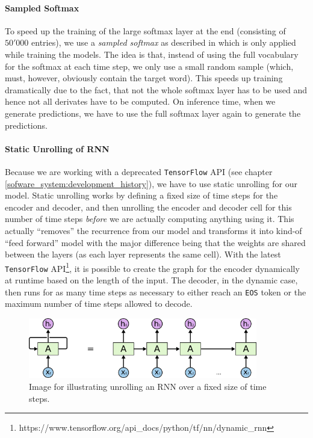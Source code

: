 \paragraph{Sampled Softmax} To speed up the training of the large softmax layer at the end (consisting of $50'000$ entries), we use a \emph{sampled softmax} as described in \cite{Sebastien:2014} which is only applied while training the models. The idea is that, instead of using the full vocabulary for the softmax at each time step, we only use a small random sample (which, must, however, obviously contain the target word). This speeds up training dramatically due to the fact, that not the whole softmax layer has to be used and hence not all derivates have to be computed. On inference time, when we generate predictions, we have to use the full softmax layer again to generate the predictions.

\paragraph{Static Unrolling of RNN} Because we are working with a deprecated \texttt{TensorFlow} API (see chapter \ref{sofware_system:development_history}), we have to use static unrolling for our model. Static unrolling works by defining a fixed size of time steps for the encoder and decoder, and then unrolling the encoder and decoder cell for this number of time steps \emph{before} we are actually computing anything using it. This actually ``removes'' the recurrence from our model and transforms it into kind-of ``feed forward'' model with the major difference being that the weights are shared between the layers (as each layer represents the same cell). With the latest \texttt{TensorFlow} API\footnote{https://www.tensorflow.org/api\_docs/python/tf/nn/dynamic\_rnn}, it is possible to create the graph for the encoder dynamically at runtime based on the length of the input. The decoder, in the dynamic case, then runs for as many time steps as necessary to either reach an \texttt{EOS} token or the maximum number of time steps allowed to decode.

\begin{figure}
	\label{methods:static_unrolling:unrolled_rnn}
	\centering
	\includegraphics[width=10cm]{img/rnn_unrolled}
	\caption{Image for illustrating unrolling an RNN over a fixed size of time steps.\protect\footnotemark}
\end{figure}

